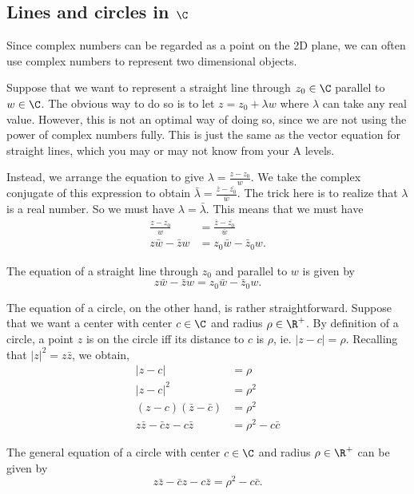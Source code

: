 \documentclass[a4paper]{article}
\begin{document}
\subsection{Lines and circles in \texorpdfstring{$\C$}{C}}
Since complex numbers can be regarded as a point on the 2D plane, we can often use complex numbers to represent two dimensional objects.

Suppose that we want to represent a straight line through $z_0 \in \C$ parallel to $w\in \C$. The obvious way to do so is to let $z = z_0 + \lambda w$ where $\lambda$ can take any real value. However, this is not an optimal way of doing so, since we are not using the power of complex numbers fully. This is just the same as the vector equation for straight lines, which you may or may not know from your A levels.

Instead, we arrange the equation to give $\lambda = \frac{z - z_0}{w}$. We take the complex conjugate of this expression to obtain $\bar{\lambda} = \frac{\bar{z} - \bar{z_0}}{\bar{w}}$. The trick here is to realize that $\lambda$ is a real number. So we must have $\lambda = \bar \lambda$. This means that we must have
\begin{align*}
  \frac{z - z_0}{w} &= \frac{\bar{z} - \bar{z_0}}{\bar{w}}\\
  z\bar w - \bar z w &= z_0 \bar w - \bar z_0 w.
\end{align*}

\begin{thm}
  The equation of a straight line through $z_0$ and parallel to $w$ is given by
  \[
    z\bar w - \bar z w = z_0 \bar w - \bar z_0 w.
  \]
\end{thm}

The equation of a circle, on the other hand, is rather straightforward. Suppose that we want a center with center $c\in \C$ and radius $\rho \in \R^+$. By definition of a circle, a point $z$ is on the circle iff its distance to $c$ is $\rho$, ie. $|z - c| = \rho$. Recalling that $|z|^2 = z\bar z$, we obtain,
\begin{align*}
  |z - c| &= \rho\\
  |z - c|^2 &= \rho^2\\
  (z - c)(\bar z - \bar c) &= \rho^2\\
  z\bar z - \bar c z - c\bar z &= \rho^2 - c\bar c
\end{align*}
\begin{thm}
  The general equation of a circle with center $c\in \C$ and radius $\rho \in \R^+$ can be given by
  \[
    z\bar z - \bar c z - c\bar z = \rho^2 - c\bar c.
  \]
\end{thm}
\end{document}
